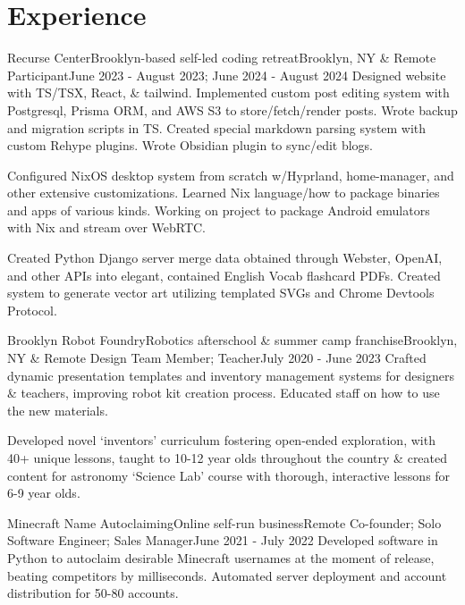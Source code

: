 \documentclass[letterpaper, 10pt]{article}
\begin{document}
\resumeSubHeadingListEnd

\section{Experience}
\resumeSubHeadingListStart

\resumeSubheading
{Recurse Center}{Brooklyn-based self-led coding retreat}{Brooklyn, NY \& Remote}
{Participant}{June 2023 - August 2023; June 2024 - August 2024}{}
\resumeItemListStart
{}
{Designed website with TS/TSX, React, \& tailwind. Implemented custom post editing system with Postgresql, Prisma ORM, and AWS S3 to store/fetch/render posts. Wrote backup and migration scripts in TS. Created special markdown parsing system with custom Rehype plugins. Wrote Obsidian plugin to sync/edit blogs.}

{Configured NixOS desktop system from scratch w/Hyprland, home-manager, and other extensive customizations. Learned Nix language/how to package binaries and apps of various kinds. Working on project to package Android emulators with Nix and stream over WebRTC.}

{Created Python Django server merge data obtained through Webster, OpenAI, and other APIs into elegant, contained English Vocab flashcard PDFs. Created system to generate vector art utilizing templated SVGs and Chrome Devtools Protocol.}
\resumeItemListEnd

\resumeSubheading
{Brooklyn Robot Foundry}{Robotics afterschool \& summer camp franchise}{Brooklyn, NY \& Remote}
{Design Team Member; Teacher}{July 2020 - June 2023}{}
\resumeItemListStart
{}
{Crafted dynamic presentation templates and inventory management systems for designers \& teachers, improving robot kit creation process. Educated staff on how to use the new materials.}

{Developed novel `inventors' curriculum fostering open-ended exploration, with 40+ unique lessons, taught to 10-12 year olds throughout the country \& created content for astronomy `Science Lab' course with thorough, interactive lessons for 6-9 year olds.}

\resumeItemListEnd

\resumeSubheading
{Minecraft Name Autoclaiming}{Online self-run business}{Remote}
{Co-founder; Solo Software Engineer; Sales Manager}{June 2021 - July 2022}{}
\resumeItemListStart
{}
{Developed software in Python to autoclaim desirable Minecraft usernames at the moment of release, beating competitors by milliseconds. Automated server deployment and account distribution for 50-80 accounts.}
\end{document}
